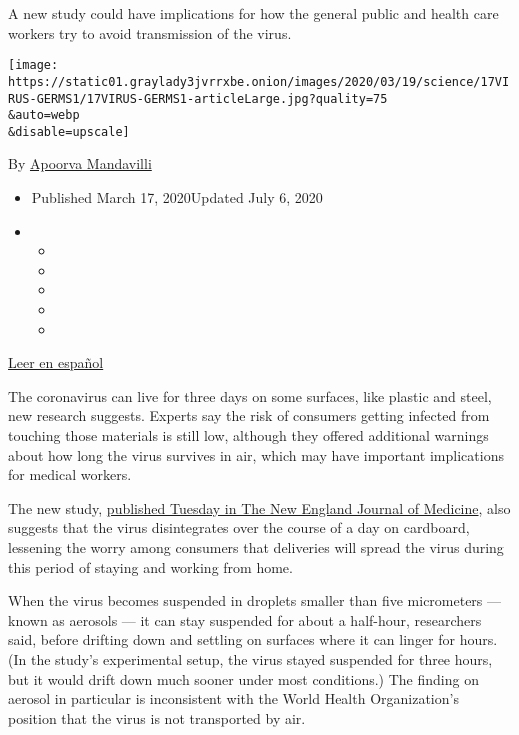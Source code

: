 A new study could have implications for how the general public and
health care workers try to avoid transmission of the virus.

\texttt{[image: https://static01.graylady3jvrrxbe.onion/images/2020/03/19/science/17VIRUS-GERMS1/17VIRUS-GERMS1-articleLarge.jpg?quality=75\\\&auto=webp\\\&disable=upscale]}

By
\href{https://www.nytimes3xbfgragh.onion/by/apoorva-mandavilli}{Apoorva
Mandavilli}

\begin{itemize}
\item
  Published March 17, 2020Updated July 6, 2020
\item
  \begin{itemize}
  \item
  \item
  \item
  \item
  \item
  \end{itemize}
\end{itemize}

\href{https://www.nytimes3xbfgragh.onion/es/2020/03/25/espanol/coronavirus-aire-como-se-transmite.html}{Leer
en español}

The coronavirus can live for three days on some surfaces, like plastic
and steel, new research suggests. Experts say the risk of consumers
getting infected from touching those materials is still low, although
they offered additional warnings about how long the virus survives in
air, which may have important implications for medical workers.

The new study,
\href{https://www.nejm.org/doi/full/10.1056/NEJMc2004973}{published
Tuesday in The New England Journal of Medicine}, also suggests that the
virus disintegrates over the course of a day on cardboard, lessening the
worry among consumers that deliveries will spread the virus during this
period of staying and working from home.

When the virus becomes suspended in droplets smaller than five
micrometers --- known as aerosols --- it can stay suspended for about a
half-hour, researchers said, before drifting down and settling on
surfaces where it can linger for hours. (In the study's experimental
setup, the virus stayed suspended for three hours, but it would drift
down much sooner under most conditions.) The finding on aerosol in
particular is inconsistent with the World Health Organization's position
that the virus is not transported by air.

